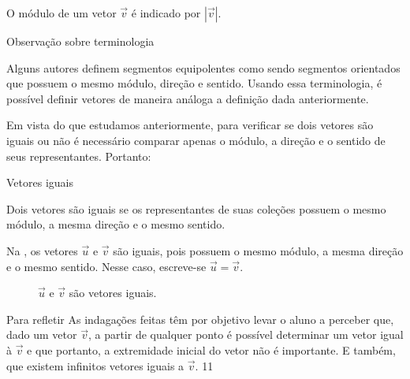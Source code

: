 O módulo de um vetor \(\vec{v}\) é indicado por \(|\vec{v}|\).

\begin{observationtitle}{Observação sobre terminologia}

Alguns autores definem segmentos equipolentes como sendo segmentos orientados que possuem o mesmo módulo, direção e sentido. Usando essa terminologia, é possível definir vetores de maneira análoga a definição dada anteriormente.
\end{observationtitle}



Em vista do que estudamos anteriormente, para verificar se dois vetores são iguais ou não é necessário comparar apenas o módulo, a direção e o sentido de seus representantes. Portanto:

\begin{observationtitle}{Vetores iguais}

Dois vetores são iguais se os representantes de suas coleções possuem o mesmo módulo, a mesma direção e o mesmo sentido.
\end{observationtitle}
\clearmargin

Na , os vetores \(\vec{u}\) e \(\vec{v}\) são iguais, pois possuem o mesmo módulo, a mesma direção e o mesmo sentido. Nesse caso, escreve-se \(\vec{u}=\vec{v}\).



\begin{figure}[H]
\centering
{} 
 \caption{$\vec{u}$ e $\vec{v}$ são vetores iguais.} \label{fig-geometria-operacoesvetores-05} 
 \end{figure}

\begin{objectives}{Para refletir}
{
As indagações feitas têm por objetivo levar o aluno a perceber que, dado um vetor \(\vec{v}\), a partir de qualquer ponto é possível determinar um vetor igual à \(\vec{v}\) e que portanto, a extremidade inicial do vetor não é importante. E também, que existem infinitos vetores iguais a \(\vec{v}\).}
{1}{1}
\end{objectives}

